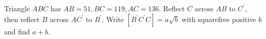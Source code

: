 Triangle $ABC$ has $AB=51,BC=119,AC=136$. Reflect $C$ across $AB$ to $C^{\prime}$, then reflect $B$ across $AC^{\prime}$ to $B^{\prime}$. Write $[B^{\prime}C^{\prime}C]=a\sqrt b$ with squarefree positive $b$ and find $a+b$.
